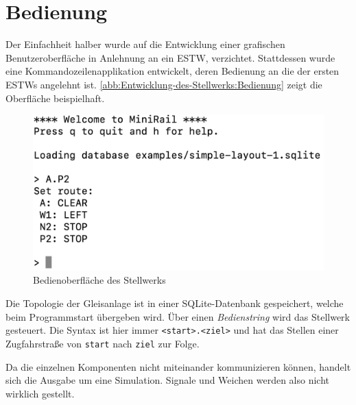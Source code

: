 \section{Bedienung}\label{text:Entwicklung-des-Stellwerks:Bedienung}

Der Einfachheit halber wurde auf die Entwicklung einer grafischen Benutzeroberfläche in Anlehnung an ein \ac{ESTW}, verzichtet. Stattdessen wurde eine Kommandozeilenapplikation entwickelt, deren Bedienung an die der ersten \ac{ESTW}s angelehnt ist. \autoref{abb:Entwicklung-des-Stellwerks:Bedienung} zeigt die Oberfläche beispielhaft.

\begin{figure}[H]
    \centering
    \includegraphics[width=.8\textwidth]{Assets/Images/5-Entwicklung-des-Stellwerks/Bedienung.png}
    \caption{Bedienoberfläche des Stellwerks}\label{abb:Entwicklung-des-Stellwerks:Bedienung}
\end{figure}

Die Topologie der Gleisanlage ist in einer SQLite-Datenbank gespeichert, welche beim Programmstart übergeben wird. Über einen \textit{Bedienstring} wird das Stellwerk gesteuert. Die Syntax ist hier immer \texttt{<start>.<ziel>} und hat das Stellen einer Zugfahrstraße von \texttt{start} nach \texttt{ziel} zur Folge.

Da die einzelnen Komponenten nicht miteinander kommunizieren können, handelt sich die Ausgabe um eine Simulation. Signale und Weichen werden also nicht wirklich gestellt.
